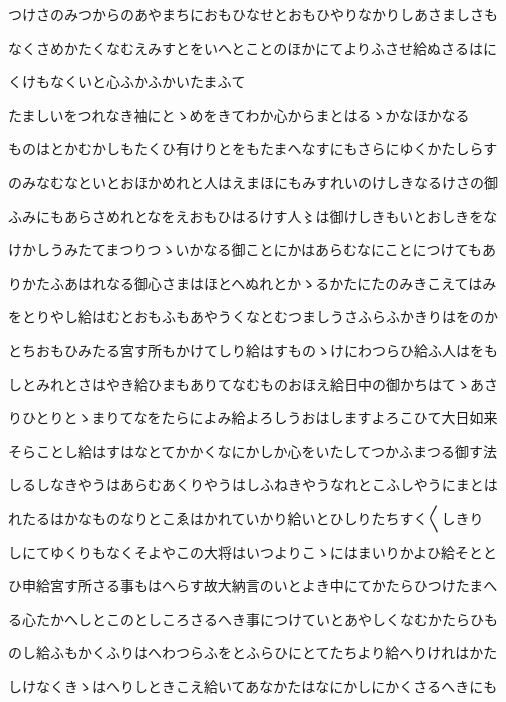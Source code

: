 \documentclass[a4paper,11pt,landscape]{ltjtarticle}
\begin{document}
\par\medskip
つけさのみつからのあやまちにおもひなせとおもひやりなかりしあさましさも
\par\medskip
なくさめかたくなむえみすとをいへとことのほかにてよりふさせ給ぬさるはに
\par\medskip
くけもなくいと心ふかふかいたまふて
\par\medskip
たましいをつれなき袖にとゝめをきてわか心からまとはるゝかなほかなる
\par\medskip
ものはとかむかしもたくひ有けりとをもたまへなすにもさらにゆくかたしらす
\par\medskip
のみなむなといとおほかめれと人はえまほにもみすれいのけしきなるけさの御
\par\medskip
ふみにもあらさめれとなをえおもひはるけす人〻は御けしきもいとおしきをな
\par\medskip
けかしうみたてまつりつゝいかなる御ことにかはあらむなにことにつけてもあ
\par\medskip
りかたふあはれなる御心さまはほとへぬれとかゝるかたにたのみきこえてはみ
\par\medskip
をとりやし給はむとおもふもあやうくなとむつましうさふらふかきりはをのか
\par\medskip
とちおもひみたる宮す所もかけてしり給はすものゝけにわつらひ給ふ人はをも
\par\medskip
しとみれとさはやき給ひまもありてなむものおほえ給日中の御かちはてゝあさ
\par\medskip
りひとりとゝまりてなをたらによみ給よろしうおはしますよろこひて大日如来
\par\medskip
そらことし給はすはなとてかかくなにかしか心をいたしてつかふまつる御す法
\par\medskip
しるしなきやうはあらむあくりやうはしふねきやうなれとこふしやうにまとは
\par\medskip
れたるはかなものなりとこゑはかれていかり給いとひしりたちすく〱しきり
\par\medskip
しにてゆくりもなくそよやこの大将はいつよりこゝにはまいりかよひ給そとと
\par\medskip
ひ申給宮す所さる事もはへらす故大納言のいとよき中にてかたらひつけたまへ
\par\medskip
る心たかへしとこのとしころさるへき事につけていとあやしくなむかたらひも
\par\medskip
のし給ふもかくふりはへわつらふをとふらひにとてたちより給へりけれはかた
\par\medskip
しけなくきゝはへりしときこえ給いてあなかたはなにかしにかくさるへきにも
\par\medskip
\end{document}
